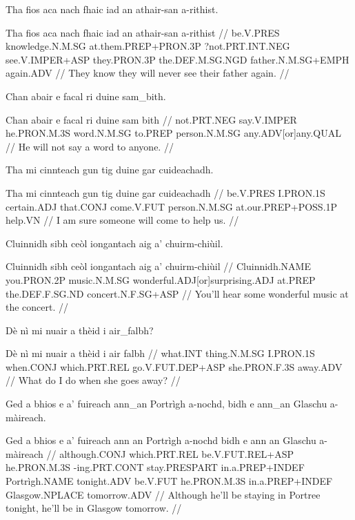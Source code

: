 \documentclass[a4paper,10pt]{article}
\begin{document}
\ex
\begingl
\glpre Tha fios aca nach fhaic iad an athair-san a-rithist. 

\vspace{4mm}
\gla Tha fios aca nach fhaic iad an athair-san a-rithist  //
\glb be.V.PRES knowledge.N.M.SG at.them.PREP+PRON.3P ?not.PRT.INT.NEG see.V.IMPER+ASP they.PRON.3P the.DEF.M.SG.NGD father.N.M.SG+EMPH again.ADV  //
\glft They know they will never see their father again. //
\endgl
\xe

\ex
\begingl
\glpre Chan abair e facal ri duine sam\_bith. 

\vspace{4mm}
\gla Chan abair e facal ri duine {sam bith}  //
\glb not.PRT.NEG say.V.IMPER he.PRON.M.3S word.N.M.SG to.PREP person.N.M.SG any.ADV[or]any.QUAL  //
\glft He will not say a word to anyone. //
\endgl
\xe

\ex
\begingl
\glpre Tha mi cinnteach gun tig duine gar cuideachadh. 

\vspace{4mm}
\gla Tha mi cinnteach gun tig duine gar cuideachadh  //
\glb be.V.PRES I.PRON.1S certain.ADJ that.CONJ come.V.FUT person.N.M.SG at.our.PREP+POSS.1P help.VN  //
\glft I am sure someone will come to help us. //
\endgl
\xe

\ex
\begingl
\glpre Cluinnidh sibh ceòl iongantach aig a' chuirm-chiùil. 

\vspace{4mm}
\gla Cluinnidh sibh ceòl iongantach aig a' chuirm-chiùil  //
\glb Cluinnidh.NAME you.PRON.2P music.N.M.SG wonderful.ADJ[or]surprising.ADJ at.PREP the.DEF.F.SG.ND concert.N.F.SG+ASP  //
\glft You'll hear some wonderful music at the concert. //
\endgl
\xe

\ex
\begingl
\glpre Dè nì mi nuair a thèid i air\_falbh? 

\vspace{4mm}
\gla Dè nì mi nuair a thèid i {air falbh}  //
\glb what.INT thing.N.M.SG I.PRON.1S when.CONJ which.PRT.REL go.V.FUT.DEP+ASP she.PRON.F.3S away.ADV  //
\glft What do I do when she goes away? //
\endgl
\xe

\ex
\begingl
\glpre Ged a bhios e a' fuireach ann\_an Portrìgh a-nochd, bidh e ann\_an Glaschu a-màireach. 

\vspace{4mm}
\gla Ged a bhios e a' fuireach {ann an} Portrìgh a-nochd bidh e {ann an} Glaschu a-màireach  //
\glb although.CONJ which.PRT.REL be.V.FUT.REL+ASP he.PRON.M.3S -ing.PRT.CONT stay.PRESPART in.a.PREP+INDEF Portrìgh.NAME tonight.ADV be.V.FUT he.PRON.M.3S in.a.PREP+INDEF Glasgow.NPLACE tomorrow.ADV  //
\glft Although he'll be staying in Portree tonight, he'll be in Glasgow tomorrow. //
\endgl
\xe
\end{document}
